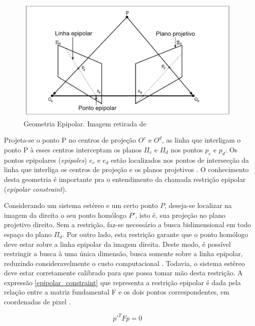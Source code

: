 \begin{figure}[H]
 	\centering
 	\includegraphics[scale=0.35]{./Resources/bradski/geometry_epipolar.png}
 	\caption{Geometria Epipolar. Imagem retirada de \cite{Mendes2012}}
 	\label{geometry_epipolar}
\end{figure}

Projeta-se o ponto P no centros de projeção $O^e$ e $O^d$, as linha que interligam o ponto P à esses centros interceptam os planos $\Pi_e$ e $\Pi_d$ nos pontos $p_e$ e $p_d$. Os pontos epipolares (\textit{epipoles}) $e_e$ e $e_d$ estão localizados nos pontos de intersecção da linha que interliga os centros de projeção e os planos projetivos \cite{Mendes2012}. O conhecimento desta geometria é importante pra o entendimento da chamada restrição epipolar (\textit{epipolar constraint}).

Considerando um sistema estéreo e um certo ponto $P$, deseja-se localizar na imagem da direita o seu ponto homólogo $P'$, isto é, sua projeção no plano projetivo direito. Sem a restrição, faz-se necessário a busca bidimensional em todo espaço do plano $\Pi_d$. Por outro lado, esta restrição garante que o ponto homólogo deve estar sobre a linha epipolar da imagem direita. Deste modo, é possível restringir a busca à uma única dimensão, busca somente sobre a linha epipolar, reduzindo consideravelmente o custo computacional \cite{Bradski2008}. Todavia, o sistema estéreo deve estar corretamente calibrado para que possa tomar mão desta restrição. A expressão \ref{epipolar_constraint} que representa a restrição epipolar é dada pela relação entre a matriz fundamental F e os dois pontos correspondentes, em coordenadas de pixel \cite{RobertLaganiere}.

\begin{equation}
 \label{epipolar_constraint}
 p'^TFp = 0
\end{equation}


